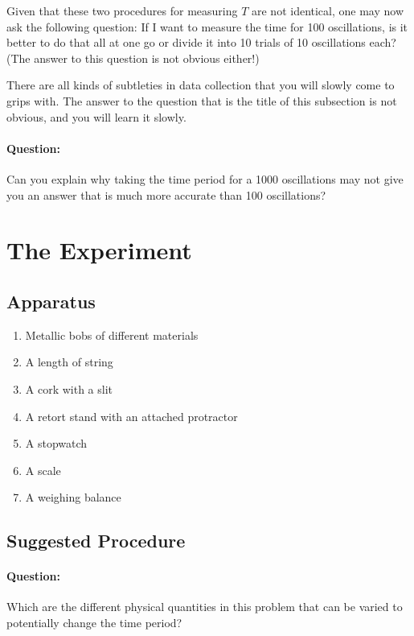 Given that these two procedures for measuring $T$ are not identical, one may now ask the following question: If I want to measure the time for 100 oscillations, is it better to do that all at one go or divide it into 10 trials of 10 oscillations each? (The answer to this question is not obvious either!) 

There are all kinds of subtleties in data collection that you will slowly come to grips with. The answer to the question that is the title of this subsection is not obvious, and you will learn it slowly. 

\begin{question}
\paragraph{Question:} Can you explain why taking the time period for a 1000 oscillations may not give you an answer that is much more accurate than 100 oscillations?
\end{question}
\newpage
\section{The Experiment}

\subsection{Apparatus}

\begin{enumerate}
    \item Metallic bobs of different materials
    \item A length of string
    \item A cork with a slit
    \item A retort stand with an attached protractor
    \item A stopwatch
    \item A scale
    \item A weighing balance
\end{enumerate}

\subsection{Suggested Procedure}

\begin{question} 
\paragraph{Question:} Which are the different physical quantities in this problem that can be varied to potentially change the time period?
\end{question}

